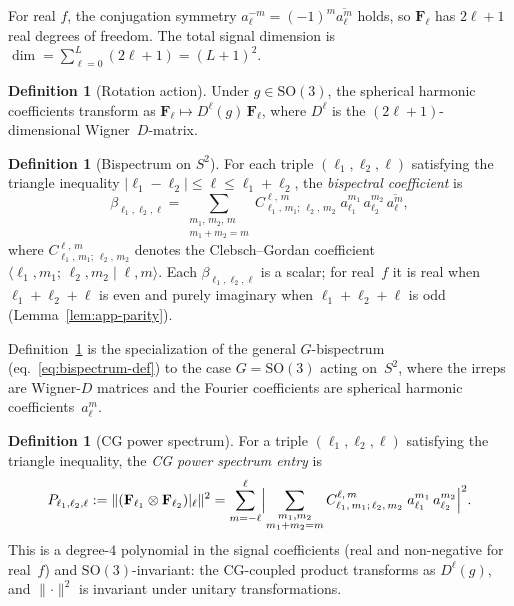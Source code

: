 \documentclass{article}
\theoremstyle{definition}
\newtheorem{definition}[theorem]{Definition}
\theoremstyle{remark}
\newcommand{\SO}{\mathrm{SO}}
\newcommand{\CG}[6]{C^{#5,\,#6}_{#1,\,#2;\,#3,\,#4}}
\newcommand{\abs}[1]{\lvert #1 \rvert}
\newcommand{\conj}[1]{\overline{#1}}
\theoremstyle{definition}
\begin{document}
\noindent
For real $f$, the conjugation symmetry
$a_\ell^{-m} = (-1)^m \conj{a_\ell^m}$ holds, so
$\mathbf{F}_\ell$ has $2\ell+1$ real degrees of freedom.
The total signal dimension is
$\dim = \sum_{\ell=0}^{L}(2\ell+1) = (L+1)^2$.

\begin{definition}[Rotation action]
Under $g \in \SO(3)$, the spherical harmonic coefficients transform as
$\mathbf{F}_\ell \mapsto D^\ell(g)\,\mathbf{F}_\ell$,
where $D^\ell$ is the $(2\ell+1)$-dimensional Wigner~$D$-matrix.
\end{definition}

\begin{definition}[Bispectrum on $S^2$]\label{def:app-bispectrum}
For each triple $(\ell_1, \ell_2, \ell)$ satisfying the triangle
inequality $\abs{\ell_1 - \ell_2} \le \ell \le \ell_1 + \ell_2$,
the \emph{bispectral coefficient} is
\begin{equation}\label{eq:app-bispectrum}
  \beta_{\ell_1,\ell_2,\ell}
  = \sum_{\substack{m_1,\,m_2,\,m \\ m_1+m_2=m}}
    \CG{\ell_1}{m_1}{\ell_2}{m_2}{\ell}{m}\;
    a_{\ell_1}^{m_1}\,a_{\ell_2}^{m_2}\,\conj{a_\ell^m},
\end{equation}
where $\CG{\ell_1}{m_1}{\ell_2}{m_2}{\ell}{m}$ denotes the
Clebsch--Gordan coefficient
$\langle \ell_1, m_1;\, \ell_2, m_2 \mid \ell, m \rangle$.
Each $\beta_{\ell_1,\ell_2,\ell}$ is a scalar; for real~$f$ it is
real when $\ell_1{+}\ell_2{+}\ell$ is even and purely imaginary when
$\ell_1{+}\ell_2{+}\ell$ is odd (Lemma~\ref{lem:app-parity}).
\end{definition}

Definition~\ref{def:app-bispectrum} is the specialization of the
general $G$-bispectrum (eq.~\eqref{eq:bispectrum-def}) to the case
$G = \SO(3)$ acting on~$S^2$, where the irreps are Wigner-$D$
matrices and the Fourier coefficients are spherical harmonic
coefficients~$a_\ell^m$.

\begin{definition}[CG power spectrum]\label{def:app-cg-power}
For a triple $(\ell_1, \ell_2, \ell)$ satisfying the triangle
inequality, the \emph{CG power spectrum entry} is
\begin{equation}\label{eq:app-cg-power}
  P_{\ell_1,\ell_2,\ell}
  := \lVert (\mathbf{F}_{\ell_1} \otimes \mathbf{F}_{\ell_2})|_\ell
     \rVert^2
  = \sum_{m=-\ell}^{\ell}
    \Bigl\lvert \sum_{\substack{m_1,m_2 \\ m_1+m_2=m}}
      \CG{\ell_1}{m_1}{\ell_2}{m_2}{\ell}{m}\;
      a_{\ell_1}^{m_1}\, a_{\ell_2}^{m_2} \Bigr\rvert^2.
\end{equation}
This is a degree-$4$ polynomial in the signal coefficients (real and
non-negative for real~$f$) and $\SO(3)$-invariant: the CG-coupled
product transforms as $D^\ell(g)$, and $\lVert \cdot \rVert^2$ is
invariant under unitary transformations.
\end{definition}
\end{document}
